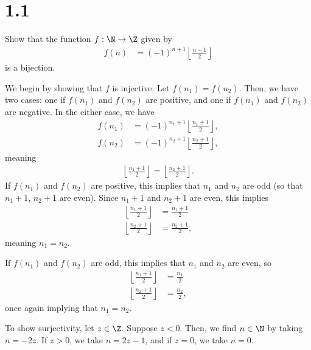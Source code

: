 \documentclass[11pt]{mypackage}
\begin{document}
\section{1.1}%
\begin{problem}
  Show that the function $f: \N\rightarrow \Z$ given by
  \begin{align*}
    f(n) &= \left(-1\right)^{n+1}\left\lfloor \frac{n+1}{2}\right\rfloor
  \end{align*}
  is a bijection.
\end{problem}
\begin{solution}
  We begin by showing that $f$ is injective. Let $f\left(n_1\right) = f\left(n_2\right)$. Then, we have two cases: one if $f\left(n_1\right)$ and $f\left(n_2\right)$ are positive, and one if $f\left(n_1\right)$ and $f\left(n_2\right)$ are negative. In the either case, we have
  \begin{align*}
    f\left(n_1\right) &= \left(-1\right)^{n_1 + 1}\left\lfloor \frac{n_1 + 1}{2}\right\rfloor,\\
    f\left(n_2\right) &= \left(-1\right)^{n_2 + 1}\left\lfloor \frac{n_2 + 1}{2}\right\rfloor,
  \end{align*}
  meaning 
  \begin{align*}
    \left\lfloor \frac{n_1 + 1}{2}\right\rfloor = \left\lfloor \frac{n_2 + 1}{2}\right\rfloor.
  \end{align*}
  If $f\left(n_1\right)$ and $f\left(n_2\right)$ are positive, this implies that $n_1$ and $n_2$ are odd (so that $n_1 + 1$, $ n_2+ 1$ are even). Since $n_1 + 1$ and $n_2 + 1$ are even, this implies
  \begin{align*}
    \left\lfloor\frac{n_1 + 1}{2}\right\rfloor &= \frac{n_1 + 1}{2}\\
    \left\lfloor \frac{n_2 + 1}{2}\right\rfloor &= \frac{n_2 + 1}{2},
  \end{align*}
  meaning $n_1 = n_2$.\newline

  If $f\left(n_1\right)$ and $f\left(n_2\right)$ are odd, this implies that $n_1$ and $n_2$ are even, so
  \begin{align*}
    \left\lfloor\frac{n_1 + 1}{2}\right\rfloor &= \frac{n_1 }{2}\\
    \left\lfloor \frac{n_2 + 1}{2}\right\rfloor &= \frac{n_2 }{2},
  \end{align*}
  once again implying that $n_1 = n_2$.\newline

  To show surjectivity, let $z\in \Z$. Suppose $z < 0$. Then, we find $n\in \N$ by taking $n = -2z$. If $z > 0$, we take $n = 2z - 1$, and if $z = 0$, we take $n = 0$.
\end{solution}
\end{document}
